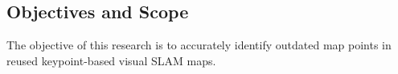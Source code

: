 \subsection{Objectives and Scope}
\label{objectives}

The objective of this research is to accurately identify outdated map points in reused keypoint-based visual SLAM maps.